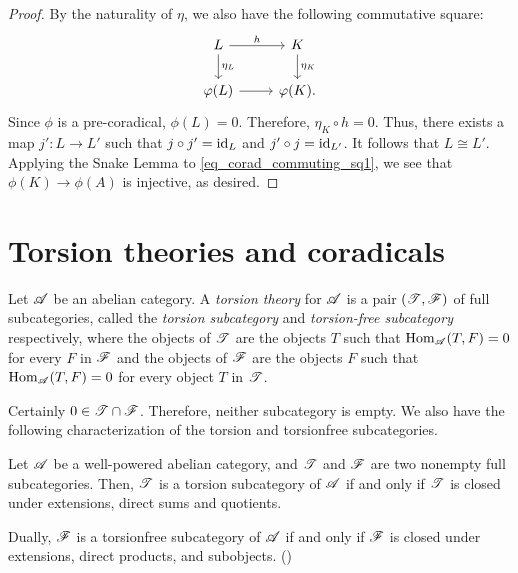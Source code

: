 \begin{proof}
By the naturality of $\eta$, we also have the following 
commutative square:
\[
\begin{tikzcd}
L \arrow{r}{h} \arrow{d}{\eta_L}&
K \arrow{d}{\eta_K} \\
\phi(L) \arrow{r} &
\phi(K).
\end{tikzcd}
\]
Since $\phi$ is a pre-coradical, $\phi(L) = 0$. Therefore,
$\eta_K \circ h = 0$. Thus, there exists a map $j': L \to L'$
such that $j\circ j' = \mathrm{id}_{L}$ and $j'\circ j = \mathrm{id}_{L'}$.
It follows that $L \cong L'$. Applying the Snake Lemma to
\eqref{eq_corad_commuting_sq1}, we see that $\phi(K) \to
\phi(A)$ is injective, as desired.
\end{proof}

\section{Torsion theories and coradicals}
\label{sect_tt_and_corads}

\begin{defn}
Let $\mathscr{A}$ be an abelian category. A \emph{torsion theory} for
$\mathscr{A}$ is a pair $(\mathscr{T}, \mathscr{F})$ of full subcategories,
called the \emph{torsion subcategory} and \emph{torsion-free 
subcategory} respectively, where the objects of $\mathscr{T}$ are
the objects $T$ such that $\mathrm{Hom}_{\mathscr{A}}(T, F) = 0$ for every $F$
in $\mathscr{F}$ and the objects of $\mathscr{F}$ are the objects $F$ such 
that $\mathrm{Hom}_{\mathscr{A}}(T, F) = 0$ for every object $T$ in $\mathscr{T}$.
\end{defn}

Certainly $0 \in \mathscr{T} \cap \mathscr{F}$. Therefore, neither 
subcategory is empty. We also have the following characterization
of the torsion and torsionfree subcategories.

\begin{prop}\label{prop_tt_properties}
Let $\mathscr{A}$ be a well-powered abelian category, and $\mathscr{T}$ 
and $\mathscr{F}$ are two nonempty full subcategories. Then, $\mathscr{T}$ 
is a torsion subcategory of $\mathscr{A}$ if and only if $\mathscr{T}$ is 
closed under extensions, direct sums and quotients. 

Dually, $\mathscr{F}$ is a torsionfree subcategory of $\mathscr{A}$ if and 
only if $\mathscr{F}$ is closed under extensions, direct products, and 
subobjects. (\CF \cite[I2.6]{BJV})
\end{prop}


